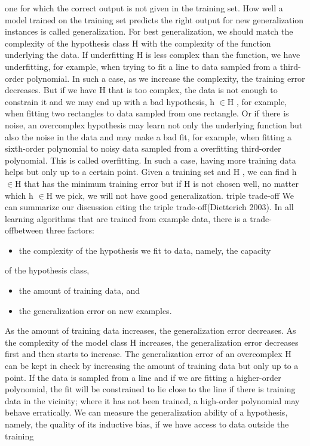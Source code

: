 one for which the correct output is not given in the training set. How well a model trained on the training set predicts the right output for new generalization instances is called generalization. For best generalization, we should match the complexity of the hypothesis class H with the complexity of the function underlying the data. If underfitting H is less complex than the function, we have underfitting, for example, when trying to fit a line to data sampled from a third-order polynomial. In such a case, as we increase the complexity, the training error decreases. But if we have H that is too complex, the data is not enough to constrain it and we may end up with a bad hypothesis, h $\in$H , for example, when fitting two rectangles to data sampled from one rectangle. Or if there is noise, an overcomplex hypothesis may learn not only the underlying function but also the noise in the data and may make a bad fit, for example, when fitting a sixth-order polynomial to noisy data sampled from a overfitting third-order polynomial. This is called overfitting. In such a case, having more training data helps but only up to a certain point. Given a training set and H , we can find h $\in$H that has the minimum training error but if H is not chosen well, no matter which h $\in$H we pick, we will not have good generalization. triple trade-off We can summarize our discussion citing the triple trade-off(Dietterich 2003). In all learning algorithms that are trained from example data, there is a trade-offbetween three factors:

\begin{itemize}
\item the complexity of the hypothesis we fit to data, namely, the capacity
\end{itemize}

of the hypothesis class,

\begin{itemize}
\item the amount of training data, and
\end{itemize}

\begin{itemize}
\item the generalization error on new examples.
\end{itemize}

As the amount of training data increases, the generalization error decreases. As the complexity of the model class H increases, the generalization error decreases first and then starts to increase. The generalization error of an overcomplex H can be kept in check by increasing the amount of training data but only up to a point. If the data is sampled from a line and if we are fitting a higher-order polynomial, the fit will be constrained to lie close to the line if there is training data in the vicinity; where it has not been trained, a high-order polynomial may behave erratically. We can measure the generalization ability of a hypothesis, namely, the quality of its inductive bias, if we have access to data outside the training

